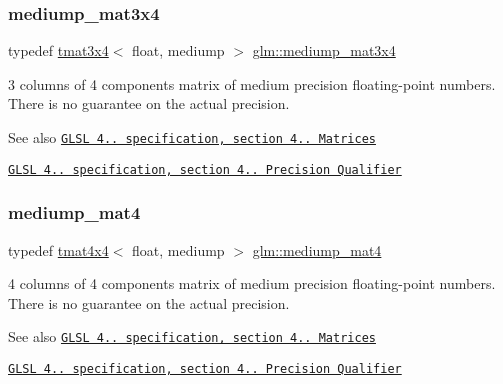 \subsubsection{\texorpdfstring{mediump\+\_\+mat3x4}{mediump\_mat3x4}}
{\footnotesize\ttfamily typedef \hyperlink{structglm_1_1tmat3x4}{tmat3x4}$<$ float, mediump $>$ \hyperlink{group__core__precision_ga0ea90a4a20efa6c104c7ad21144ccefe}{glm\+::mediump\+\_\+mat3x4}}

3 columns of 4 components matrix of medium precision floating-\/point numbers. There is no guarantee on the actual precision.

\begin{DoxySeeAlso}{See also}
\href{http://www.opengl.org/registry/doc/GLSLangSpec.4.20.8.pdf}{\tt G\+L\+SL 4.. specification, section 4.. Matrices} 

\href{http://www.opengl.org/registry/doc/GLSLangSpec.4.20.8.pdf}{\tt G\+L\+SL 4.. specification, section 4.. Precision Qualifier} 
\end{DoxySeeAlso}
\mbox{\label{group__core__precision_ga2bd55bee1eaded7673421b1ae24175d5}} 
\subsubsection{\texorpdfstring{mediump\+\_\+mat4}{mediump\_mat4}}
{\footnotesize\ttfamily typedef \hyperlink{structglm_1_1tmat4x4}{tmat4x4}$<$ float, mediump $>$ \hyperlink{group__core__precision_ga2bd55bee1eaded7673421b1ae24175d5}{glm\+::mediump\+\_\+mat4}}

4 columns of 4 components matrix of medium precision floating-\/point numbers. There is no guarantee on the actual precision.

\begin{DoxySeeAlso}{See also}
\href{http://www.opengl.org/registry/doc/GLSLangSpec.4.20.8.pdf}{\tt G\+L\+SL 4.. specification, section 4.. Matrices} 

\href{http://www.opengl.org/registry/doc/GLSLangSpec.4.20.8.pdf}{\tt G\+L\+SL 4.. specification, section 4.. Precision Qualifier} 
\end{DoxySeeAlso}
\mbox{\label{group__core__precision_gaa8a2840660d106dca70acf525e8bfa6c}} 

